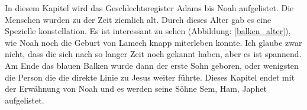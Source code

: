 In diesem Kapitel wird das Geschlechtsregister Adams bis Noah aufgelistet. Die Menschen wurden zu der Zeit ziemlich alt. Durch dieses Alter gab es eine Spezielle konstellation.
Es ist interessant zu sehen (Abbildung: \ref{balken_alter}), wie Noah noch die Geburt von Lamech knapp miterleben konnte. Ich glaube zwar nicht, dass die sich nach so langer Zeit noch gekannt haben, aber es ist spannend. Am Ende das blauen Balken wurde dann der erste Sohn geboren, oder wenigsten die Person die die direkte Linie zu Jesus weiter führte. 
Dieses Kapitel endet mit der Erwähnung von Noah und es werden seine Söhne Sem, Ham, Japhet aufgelistet.